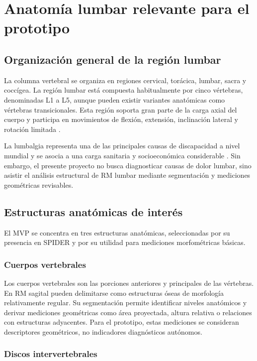 \section{Anatomía lumbar relevante para el prototipo}

\subsection{Organización general de la región lumbar}

La columna vertebral se organiza en regiones cervical, torácica, lumbar, sacra y coccígea. La región lumbar está compuesta habitualmente por cinco vértebras, denominadas L1 a L5, aunque pueden existir variantes anatómicas como vértebras transicionales. Esta región soporta gran parte de la carga axial del cuerpo y participa en movimientos de flexión, extensión, inclinación lateral y rotación limitada \parencite{standring_grays_2020}.

La lumbalgia representa una de las principales causas de discapacidad a nivel mundial y se asocia a una carga sanitaria y socioeconómica considerable \parencite{hoy_low_back_pain_2014}. Sin embargo, el presente proyecto no busca diagnosticar causas de dolor lumbar, sino asistir el análisis estructural de RM lumbar mediante segmentación y mediciones geométricas revisables.

\subsection{Estructuras anatómicas de interés}

El MVP se concentra en tres estructuras anatómicas, seleccionadas por su presencia en SPIDER y por su utilidad para mediciones morfométricas básicas.

\subsubsection{Cuerpos vertebrales}

Los cuerpos vertebrales son las porciones anteriores y principales de las vértebras. En RM sagital pueden delimitarse como estructuras óseas de morfología relativamente regular. Su segmentación permite identificar niveles anatómicos y derivar mediciones geométricas como área proyectada, altura relativa o relaciones con estructuras adyacentes. Para el prototipo, estas mediciones se consideran descriptores geométricos, no indicadores diagnósticos autónomos.

\subsubsection{Discos intervertebrales}

